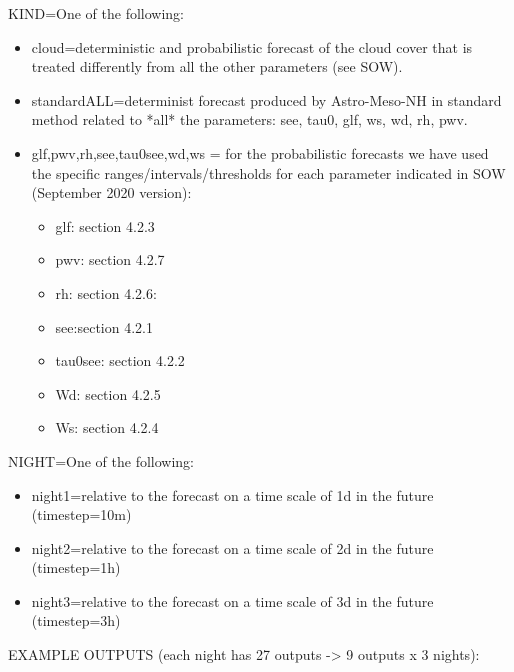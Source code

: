 \documentclass[11pt,english]{article}
\begin{document}
%
KIND=One of the following:
%
\begin{itemize}	
\item cloud=deterministic and probabilistic forecast of the cloud cover that is treated differently from all the other parameters (see SOW).
\item standardALL=determinist forecast produced by Astro-Meso-NH in standard method related to *all* the parameters: see, tau0, glf, ws, wd, rh, pwv.
\item glf,pwv,rh,see,tau0see,wd,ws = for the probabilistic forecasts we have used the specific ranges/intervals/thresholds for each parameter indicated in SOW (September 2020 version):
\begin{itemize}
\item glf: section 4.2.3
\item pwv: section 4.2.7
\item rh: section 4.2.6:
\item see:section 4.2.1
\item tau0see: section 4.2.2
\item Wd: section 4.2.5
\item Ws: section 4.2.4
\end{itemize}
\end{itemize}
%       
%
%
NIGHT=One of the following:
\begin{itemize}
\item night1=relative to the forecast on a time scale of 1d in the future (timestep=10m)
\item night2=relative to the forecast on a time scale of 2d in the future (timestep=1h)
\item night3=relative to the forecast on a time scale of 3d in the future (timestep=3h)
\end{itemize}
%
%
EXAMPLE OUTPUTS (each night has 27 outputs -> 9 outputs x 3 nights):
\end{document}
